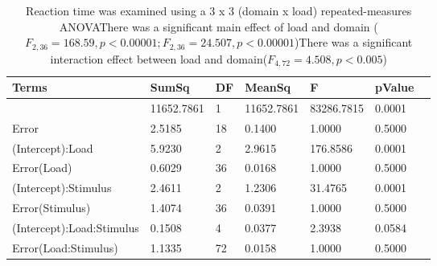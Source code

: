 \begin{table}
\centering
\begin{tabular}[0.2em]{@{}lllllll@{}}\toprule
Terms & SumSq & DF & MeanSq & F & pValue\\\toprule[0.2em]
(Intercept) & 11652.7861 & 1 & 11652.7861 & 83286.7815 & 0.0001 \\\midrule
Error & 2.5185 & 18 & 0.1400 & 1.0000 & 0.5000 \\\midrule
(Intercept):Load & 5.9230 & 2 & 2.9615 & 176.8586 & 0.0001 \\\midrule
Error(Load) & 0.6029 & 36 & 0.0168 & 1.0000 & 0.5000 \\\midrule
(Intercept):Stimulus & 2.4611 & 2 & 1.2306 & 31.4765 & 0.0001 \\\midrule
Error(Stimulus) & 1.4074 & 36 & 0.0391 & 1.0000 & 0.5000 \\\midrule
(Intercept):Load:Stimulus & 0.1508 & 4 & 0.0377 & 2.3938 & 0.0584 \\\midrule
Error(Load:Stimulus) & 1.1335 & 72 & 0.0158 & 1.0000 & 0.5000 \\\bottomrule[0.2em]
\end{tabular}
\caption{Reaction time was examined using a 3 x 3 (domain x load) repeated-measures ANOVAThere was a significant main effect of load and domain ($F_{2,36}=168.59, p<0.00001;F_{2,36}=24.507, p<0.00001$)There was a significant interaction effect between load and domain($F_{4,72}=4.508, p<0.005$)\label{tabel:behStudy1RT}}
\end{table}
